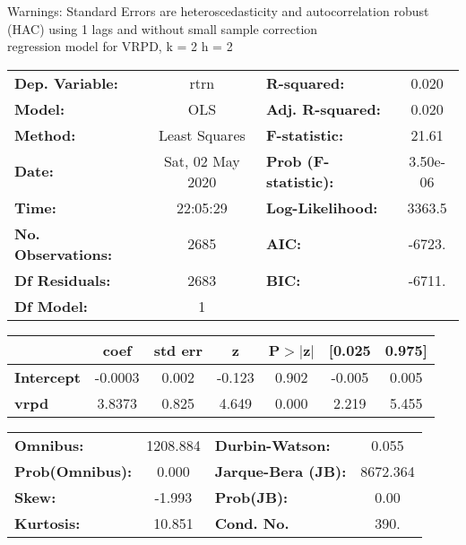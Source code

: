 Warnings: \newline
 [1] Standard Errors are heteroscedasticity and autocorrelation robust (HAC) using 1 lags and without small sample correction\\ 

regression model for VRPD, k = 2 h = 2\begin{center}
\begin{tabular}{lclc}
\toprule
\textbf{Dep. Variable:}    &       rtrn       & \textbf{  R-squared:         } &     0.020   \\
\textbf{Model:}            &       OLS        & \textbf{  Adj. R-squared:    } &     0.020   \\
\textbf{Method:}           &  Least Squares   & \textbf{  F-statistic:       } &     21.61   \\
\textbf{Date:}             & Sat, 02 May 2020 & \textbf{  Prob (F-statistic):} &  3.50e-06   \\
\textbf{Time:}             &     22:05:29     & \textbf{  Log-Likelihood:    } &    3363.5   \\
\textbf{No. Observations:} &        2685      & \textbf{  AIC:               } &    -6723.   \\
\textbf{Df Residuals:}     &        2683      & \textbf{  BIC:               } &    -6711.   \\
\textbf{Df Model:}         &           1      & \textbf{                     } &             \\
\bottomrule
\end{tabular}
\begin{tabular}{lcccccc}
                   & \textbf{coef} & \textbf{std err} & \textbf{z} & \textbf{P$> |$z$|$} & \textbf{[0.025} & \textbf{0.975]}  \\
\midrule
\textbf{Intercept} &      -0.0003  &        0.002     &    -0.123  &         0.902        &       -0.005    &        0.005     \\
\textbf{vrpd}      &       3.8373  &        0.825     &     4.649  &         0.000        &        2.219    &        5.455     \\
\bottomrule
\end{tabular}
\begin{tabular}{lclc}
\textbf{Omnibus:}       & 1208.884 & \textbf{  Durbin-Watson:     } &    0.055  \\
\textbf{Prob(Omnibus):} &   0.000  & \textbf{  Jarque-Bera (JB):  } & 8672.364  \\
\textbf{Skew:}          &  -1.993  & \textbf{  Prob(JB):          } &     0.00  \\
\textbf{Kurtosis:}      &  10.851  & \textbf{  Cond. No.          } &     390.  \\
\bottomrule
\end{tabular}
\end{center}

